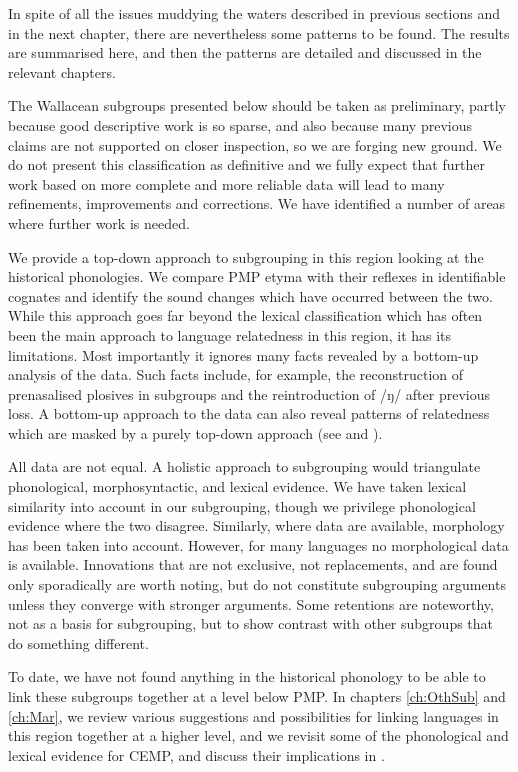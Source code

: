 In spite of all the issues muddying the waters described in previous sections
and in the next chapter,
there are nevertheless some patterns to be found.
The results are summarised here,
and then the patterns are detailed
and discussed in the relevant chapters.

The Wallacean subgroups presented below should be taken as preliminary,
partly because good descriptive work is so sparse,
and also because many previous claims are not supported on closer inspection,
so we are forging new ground.
We do not present this classification as definitive
and we fully expect that further work based on more complete
and more reliable data will lead to many refinements, improvements and corrections.
We have identified a number of areas where further work is needed.

We provide a top-down approach to subgrouping in this region looking at the historical phonologies.
We compare PMP etyma with their reflexes in identifiable cognates
and identify the sound changes which have occurred between the two.
While this approach goes far beyond the lexical classification which has often been the main approach
to language relatedness in this region,
it has its limitations.
Most importantly it ignores many facts revealed by a bottom-up analysis of the data.
Such facts include, for example,
the reconstruction of prenasalised plosives in subgroups
and the reintroduction of /ŋ/ after previous loss.
A bottom-up approach to the data can also reveal patterns of relatedness
which are masked by a purely
top-down approach (see \citealp{Edwards2018a} and \citealp{Edwards2018c}).

All data are not equal.
A holistic approach to subgrouping would triangulate phonological,
morphosyntactic, and lexical evidence.
We have taken lexical similarity into account in our subgrouping,
though we privilege phonological evidence where the two disagree.
Similarly, where data are available,
morphology has been taken into account.
However, for many languages no morphological data is available.
Innovations that are not exclusive,
not replacements, and are found only sporadically are worth noting,
but do not constitute subgrouping arguments unless they converge with stronger arguments.
Some retentions are noteworthy,
not as a basis for subgrouping,
but to show contrast with other subgroups that do something different.

To date, we have not found anything in the historical phonology
to be able to link these subgroups together
at a level below PMP.
In chapters \ref{ch:OthSub} and \ref{ch:Mar}, we review various suggestions
and possibilities for linking languages in this region together at a higher level,
and we revisit some of the phonological
and lexical evidence for CEMP,
and discuss their implications in .

